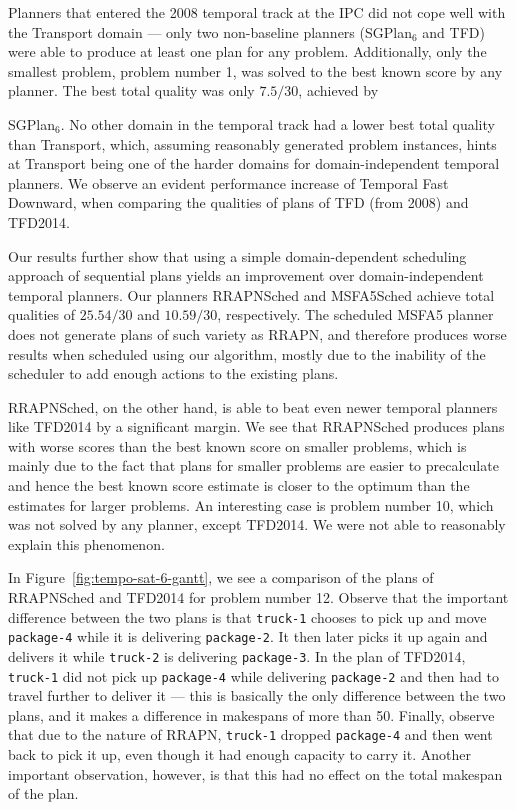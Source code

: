 Planners that entered the 2008 temporal track at the IPC did not cope well with the Transport domain
--- only two non-baseline planners (SGPlan$_6$ and TFD) were able to produce at least one plan
for any problem. Additionally, only the smallest problem, problem number 1, was solved
to the best known score by any planner.
The best total quality was only $7.5/30$, achieved by
{SGPlan$_6$. No other domain in the temporal track had a lower best total quality
than Transport, which, assuming reasonably generated problem instances, hints
at Transport being one of the harder domains for domain-independent temporal planners.
We observe an evident performance increase of Temporal Fast Downward,
when comparing the qualities of plans of TFD (from 2008) and TFD2014.

Our results further show that using a simple domain-dependent scheduling approach
of sequential plans yields an improvement over domain-independent temporal planners. Our planners RRAPNSched
and MSFA5Sched achieve total qualities of $25.54/30$
and $10.59/30$, respectively.
The scheduled MSFA5 planner does not generate plans of such variety as RRAPN,
and therefore produces worse results when scheduled using our algorithm,
mostly due to the inability of the scheduler to add enough 
actions to the existing plans.

RRAPNSched, on the other hand, is able to beat even newer temporal planners like TFD2014
by a significant margin.
We see that RRAPNSched produces plans with worse scores than the best known score on smaller problems, which is mainly due to the fact that plans for smaller problems are easier to precalculate and hence the best known score estimate is closer
to the optimum than the estimates for larger problems.
An interesting case is problem number 10,
which was not solved by any planner, except TFD2014. We were not able to reasonably explain
this phenomenon. 

In Figure~\ref{fig:tempo-sat-6-gantt}, we see a comparison of the plans
of RRAPNSched and TFD2014 for problem number 12.
Observe that the important difference between the two plans
is that \texttt{truck-1} chooses to pick up and move \texttt{package-4}
while it is delivering \texttt{package-2}. It then later picks it up again and delivers
it while \texttt{truck-2} is delivering \texttt{package-3}.
In the plan of TFD2014, \texttt{truck-1} did not pick up \texttt{package-4}
while delivering \texttt{package-2} and then had to travel further to deliver it
--- this is basically the only difference between the two plans,
and it makes a difference in makespans of more than 50.
Finally, observe that due to the nature of RRAPN, \texttt{truck-1}
dropped \texttt{package-4} and then went back to pick it up, even though it had enough capacity
to carry it. Another important observation, however, is that this had no effect on the total makespan
of the plan.

}
